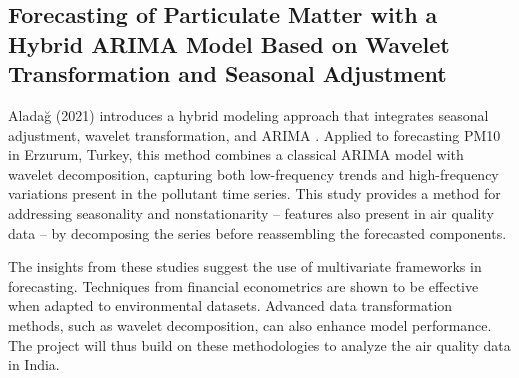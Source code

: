 \documentclass[fleqn,10pt]{SelfArx} %
\begin{document}
\subsection*{Forecasting of Particulate Matter with a Hybrid ARIMA Model Based on Wavelet Transformation and Seasonal Adjustment}
Aladağ (2021) introduces a hybrid modeling approach that integrates seasonal adjustment, wavelet transformation, and ARIMA \cite{aladag2021}. Applied to forecasting PM10 in Erzurum, Turkey, this method combines a classical ARIMA model with wavelet decomposition, capturing both low-frequency trends and high-frequency variations present in the pollutant time series. This study provides a method for addressing seasonality and nonstationarity -- features also present in air quality data -- by decomposing the series before reassembling the forecasted components.

\medskip

The insights from these studies suggest the use of multivariate frameworks in forecasting. Techniques from financial econometrics are shown to be effective when adapted to environmental datasets. Advanced data transformation methods, such as wavelet decomposition, can also enhance model performance. The project will thus build on these methodologies to analyze the air quality data in India.







\end{document}
